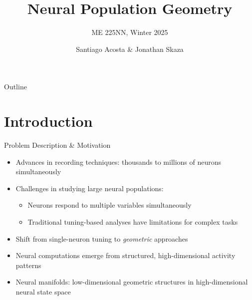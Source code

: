 \documentclass[aspectratio=169]{beamer}
\title[Neural Population Geometry]{Neural Population Geometry}
\subtitle{ME 225NN, Winter 2025}
\author[Acosta \& Skaza]{Santiago Acosta \& Jonathan Skaza}
\institute[UCSB]{Dynamical Neuroscience Graduate Program\\University of California, Santa Barbara}
\date{}
\begin{document}
\begin{frame}
    \titlepage
\end{frame}

\begin{frame}{Outline}
    \tableofcontents
\end{frame}

\section{Introduction}

\begin{frame}{Problem Description \& Motivation}
    \begin{itemize}
        \item Advances in recording techniques: thousands to millions of neurons simultaneously
        \item Challenges in studying large neural populations:
        \begin{itemize}
            \item Neurons respond to multiple variables simultaneously
            \item Traditional tuning-based analyses have limitations for complex tasks
        \end{itemize}
        \item Shift from single-neuron tuning to \textit{geometric} approaches
        \item Neural computations emerge from structured, high-dimensional activity patterns
        \item Neural manifolds: low-dimensional geometric structures in high-dimensional neural state space
    \end{itemize}
\end{frame}
\end{document}
